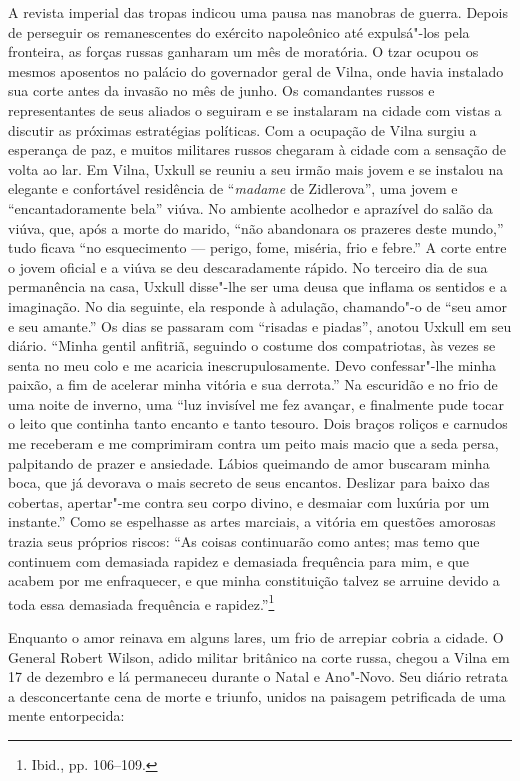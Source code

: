 A revista imperial das tropas indicou uma pausa nas manobras de guerra.
Depois de perseguir os remanescentes do exército napoleônico até
expulsá"-los pela fronteira, as forças russas ganharam um mês de
moratória. O tzar ocupou os mesmos aposentos no palácio do governador
geral de Vilna, onde havia instalado sua corte antes da invasão no mês
de junho. Os comandantes russos e representantes de seus aliados o
seguiram e se instalaram na cidade com vistas a discutir as próximas
estratégias políticas. Com a ocupação de Vilna surgiu a esperança de
paz, e muitos militares russos chegaram à cidade com a sensação de volta
ao lar. Em Vilna, Uxkull se reuniu a seu irmão mais jovem e se instalou
na elegante e confortável residência de ``\textit{madame} de Zidlerova'', uma
jovem e ``encantadoramente bela'' viúva. No ambiente acolhedor e
aprazível do salão da viúva, que, após a morte do marido, ``não
abandonara os prazeres deste mundo,'' tudo ficava ``no esquecimento ---
perigo, fome, miséria, frio e febre.'' A corte entre o jovem oficial e a
viúva se deu descaradamente rápido. No terceiro dia de sua permanência
na casa, Uxkull disse"-lhe ser uma deusa que inflama os sentidos e a
imaginação. No dia seguinte, ela responde à adulação, chamando"-o de
``seu amor e seu amante.'' Os dias se passaram com ``risadas e piadas'',
anotou Uxkull em seu diário. ``Minha gentil anfitriã, seguindo o costume
dos compatriotas, às vezes se senta no meu colo e me acaricia
inescrupulosamente. Devo confessar"-lhe minha paixão, a fim de acelerar
minha vitória e sua derrota.'' Na escuridão e no frio de uma noite de
inverno, uma ``luz invisível me fez avançar, e finalmente pude tocar o
leito que continha tanto encanto e tanto tesouro. Dois braços roliços e
carnudos me receberam e me comprimiram contra um peito mais macio que a
seda persa, palpitando de prazer e ansiedade. Lábios queimando de amor
buscaram minha boca, que já devorava o mais secreto de seus encantos.
Deslizar para baixo das cobertas, apertar"-me contra seu corpo divino, e
desmaiar com luxúria por um instante.'' Como se espelhasse as artes
marciais, a vitória em questões amorosas trazia seus próprios riscos:
``As coisas continuarão como antes; mas temo que continuem com demasiada
rapidez e demasiada frequência para mim, e que acabem por me
enfraquecer, e que minha constituição talvez se arruine devido a toda
essa demasiada frequência e rapidez.''\footnote{Ibid., pp. 106--109.}

Enquanto o amor reinava em alguns lares, um frio de arrepiar cobria a
cidade. O General Robert Wilson, adido militar britânico na corte russa,
chegou a Vilna em 17 de dezembro e lá permaneceu durante o Natal e
Ano"-Novo. Seu diário retrata a desconcertante cena de morte e triunfo,
unidos na paisagem petrificada de uma mente entorpecida:


